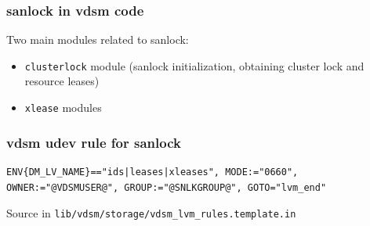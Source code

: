 \documentclass[10pt,utf8]{beamer}
\begin{document}
\begin{frame}
  \frametitle{sanlock in vdsm code}
  Two main modules related to sanlock:
    \begin{itemize}
        \item \texttt{clusterlock} module (sanlock initialization, obtaining cluster lock and resource leases)
        \item \texttt{xlease} modules
    \end{itemize}
\end{frame}

\begin{frame}[fragile]
    \frametitle{vdsm udev rule for sanlock}
    \begin{lstlisting}[style=bash]
ENV{DM_LV_NAME}=="ids|leases|xleases", MODE:="0660", OWNER:="@VDSMUSER@", GROUP:="@SNLKGROUP@", GOTO="lvm_end"
    \end{lstlisting}
    Source in \texttt{lib/vdsm/storage/vdsm\_lvm\_rules.template.in}
\end{frame}

% 
\end{document}
